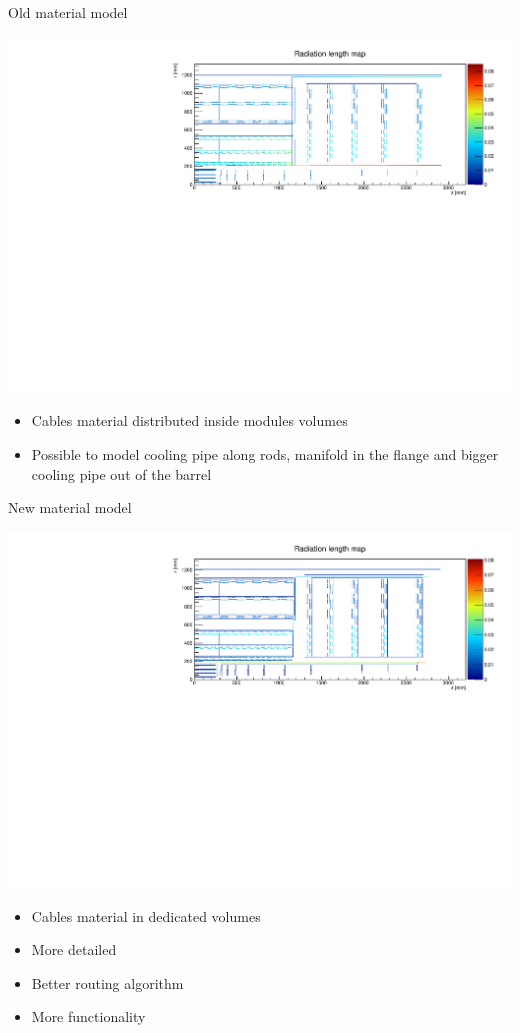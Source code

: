\documentclass[pdftex, 11pt]{beamer}
\begin{document}
\begin{frame}{Old material model}
  \begin{center}
    \includegraphics[width=\textwidth]{img/oldModel.pdf}
  \end{center}
  \begin{itemize}
  \item Cables material distributed \alert{inside} modules volumes
  \item Possible to model \alert{cooling pipe} along rods, \alert{manifold} in the flange and bigger cooling pipe out of the barrel
  \end{itemize}
\end{frame}

\begin{frame}{New material model}
  \begin{center}
    \includegraphics[width=\textwidth]{img/newModel.pdf}
  \end{center}
  \begin{itemize}
  \item Cables material in \alert{dedicated} volumes
  \item More \alert{detailed}
  \item Better routing \alert{algorithm}
  \item More \alert{functionality}
  \end{itemize}
\end{frame}
\end{document}
